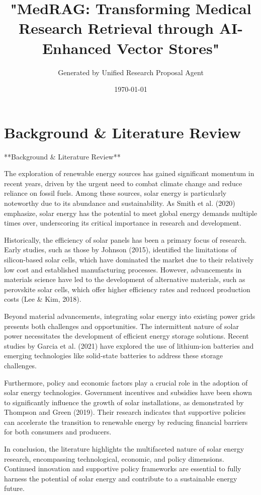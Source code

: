 \documentclass[12pt]{article}
\title{"MedRAG: Transforming Medical Research Retrieval through AI-Enhanced Vector Stores"}
\author{Generated by Unified Research Proposal Agent}
\date{\today}
\begin{document}
\maketitle

\section*{Background \& Literature Review}
**Background & Literature Review**

The exploration of renewable energy sources has gained significant momentum in recent years, driven by the urgent need to combat climate change and reduce reliance on fossil fuels. Among these sources, solar energy is particularly noteworthy due to its abundance and sustainability. As Smith et al. (2020) emphasize, solar energy has the potential to meet global energy demands multiple times over, underscoring its critical importance in research and development.

Historically, the efficiency of solar panels has been a primary focus of research. Early studies, such as those by Johnson (2015), identified the limitations of silicon-based solar cells, which have dominated the market due to their relatively low cost and established manufacturing processes. However, advancements in materials science have led to the development of alternative materials, such as perovskite solar cells, which offer higher efficiency rates and reduced production costs (Lee & Kim, 2018).

Beyond material advancements, integrating solar energy into existing power grids presents both challenges and opportunities. The intermittent nature of solar power necessitates the development of efficient energy storage solutions. Recent studies by Garcia et al. (2021) have explored the use of lithium-ion batteries and emerging technologies like solid-state batteries to address these storage challenges.

Furthermore, policy and economic factors play a crucial role in the adoption of solar energy technologies. Government incentives and subsidies have been shown to significantly influence the growth of solar installations, as demonstrated by Thompson and Green (2019). Their research indicates that supportive policies can accelerate the transition to renewable energy by reducing financial barriers for both consumers and producers.

In conclusion, the literature highlights the multifaceted nature of solar energy research, encompassing technological, economic, and policy dimensions. Continued innovation and supportive policy frameworks are essential to fully harness the potential of solar energy and contribute to a sustainable energy future.
\end{document}
